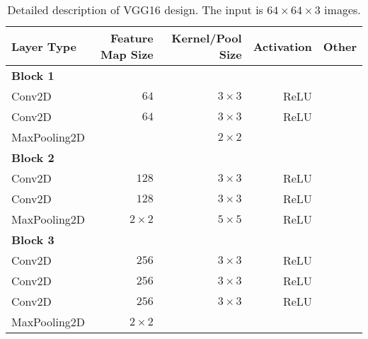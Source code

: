 \begin{table}[H]
	\centering
	\caption{Detailed description of VGG16 design. The input is $64\times64\times3$ images.}
	\label{tab:vgg16}
	\begin{tabular}{lrrrr}
		\textbf{Layer Type}     & \textbf{Feature Map Size} & \textbf{Kernel/Pool Size} & \textbf{Activation} & \textbf{Other} \\ \hline
		\textbf{Block 1}        &                           &                           &                     &                \\
		\rowcolor{lightGrey}  
		Conv2D                  & $64$                      & $3\times3$                & ReLU                &                \\
		Conv2D                  & $64$                      & $3\times3$                & ReLU                &                \\
		\rowcolor{lightGrey} 
		MaxPooling2D            &                           & $2\times2$                &                     &                \\
		\textbf{Block 2}        &                           &                           &                     &                \\
		\rowcolor{lightGrey}  
		Conv2D                  & $128$                     & $3\times3$                & ReLU                &                \\
		Conv2D                  & $128$                     & $3\times3$                & ReLU                &                \\
		\rowcolor{lightGrey}  
		MaxPooling2D            & $2\times2$                & $5\times5$                & ReLU                &                \\
		\textbf{Block 3}        &                           &                           &                     &                \\
		\rowcolor{lightGrey}  
		Conv2D                  & $256$                     & $3\times3$                & ReLU                &                \\
		Conv2D                  & $256$                     & $3\times3$                & ReLU                &                \\
		\rowcolor[HTML]{EFEFEF} 
		Conv2D                  & $256$                     & $3\times3$                & ReLU                &                \\
		MaxPooling2D            & $2\times2$                &                           &                     &                \\

\end{tabular}
\end{table}
